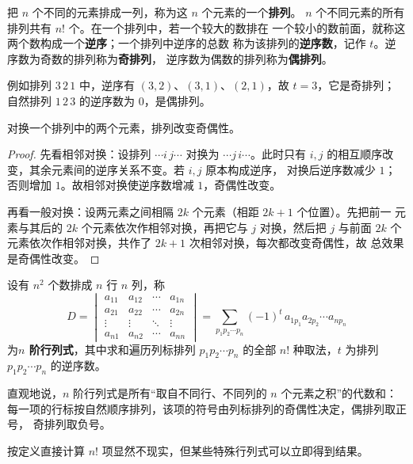 \begin{definition}\label{def:permutation}
把 $n$ 个不同的元素排成一列，称为这 $n$ 个元素的一个\textbf{排列}。
$n$ 个不同元素的所有排列共有 $n!$ 个。在一个排列中，若一个较大的数排在
一个较小的数前面，就称这两个数构成一个\textbf{逆序}；一个排列中逆序的总数
称为该排列的\textbf{逆序数}，记作 $t$。逆序数为奇数的排列称为\textbf{奇排列}，
逆序数为偶数的排列称为\textbf{偶排列}。
\end{definition}

例如排列 $3\,2\,1$ 中，逆序有 $(3,2)$、$(3,1)$、$(2,1)$，故 $t=3$，它是奇排列；
自然排列 $1\,2\,3$ 的逆序数为 $0$，是偶排列。

\begin{theorem}\label{thm:swap-parity}
对换一个排列中的两个元素，排列改变奇偶性。
\end{theorem}
\begin{proof}
先看相邻对换：设排列 $\cdots i\,j\cdots$ 对换为 $\cdots j\,i\cdots$。此时只有
$i,j$ 的相互顺序改变，其余元素间的逆序关系不变。若 $i,j$ 原本构成逆序，
对换后逆序数减少 $1$；否则增加 $1$。故相邻对换使逆序数增减 $1$，奇偶性改变。

再看一般对换：设两元素之间相隔 $2k$ 个元素（相距 $2k+1$ 个位置）。先把前一
元素与其后的 $2k$ 个元素依次作相邻对换，再把它与 $j$ 对换，然后把 $j$ 与前面
$2k$ 个元素依次作相邻对换，共作了 $2k+1$ 次相邻对换，每次都改变奇偶性，故
总效果是奇偶性改变。
\end{proof}

\begin{definition}\label{def:det-n}
设有 $n^2$ 个数排成 $n$ 行 $n$ 列，称
\[
  D=\begin{vmatrix}
      a_{11} & a_{12} & \cdots & a_{1n} \\
      a_{21} & a_{22} & \cdots & a_{2n} \\
      \vdots & \vdots & \ddots & \vdots \\
      a_{n1} & a_{n2} & \cdots & a_{nn}
    \end{vmatrix}
  =\sum_{p_1p_2\cdots p_n}(-1)^{t}\,a_{1p_1}a_{2p_2}\cdots a_{np_n}
\]
为\textbf{$n$ 阶行列式}，其中求和遍历列标排列 $p_1p_2\cdots p_n$ 的全部 $n!$
种取法，$t$ 为排列 $p_1p_2\cdots p_n$ 的逆序数。
\end{definition}

直观地说，$n$ 阶行列式是所有“取自不同行、不同列的 $n$ 个元素之积”的代数和：
每一项的行标按自然顺序排列，该项的符号由列标排列的奇偶性决定，偶排列取正号，
奇排列取负号。

按定义直接计算 $n!$ 项显然不现实，但某些特殊行列式可以立即得到结果。

